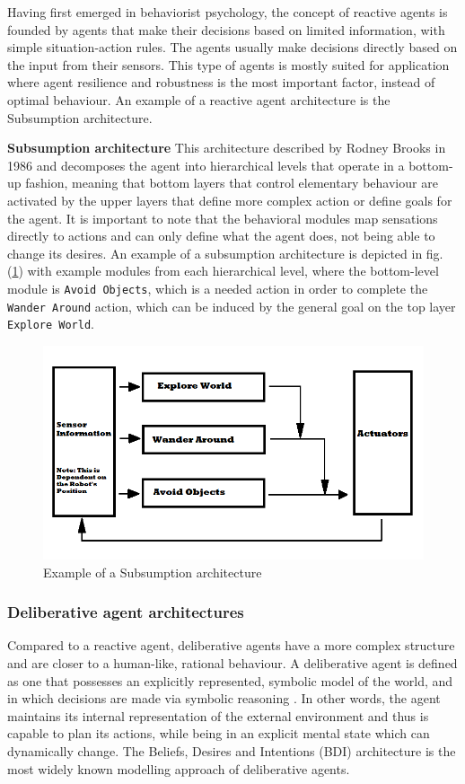 \documentclass[main.tex]{subfiles}
\begin{document}
Having first emerged in behaviorist psychology, the concept of reactive agents is founded by agents
that make their decisions based on limited information, with simple situation-action rules. The agents
usually make decisions directly based on the input from their sensors. This type of agents is mostly
suited for application where agent resilience and robustness is the most important factor, instead
of optimal behaviour. An example of a reactive agent architecture is the Subsumption architecture.

\textbf{Subsumption architecture}\newline
This architecture described by Rodney Brooks in 1986 \cite{1087032} and
decomposes the agent into hierarchical levels that operate in a bottom-up
fashion, meaning that bottom layers that control elementary behaviour are
activated by the upper layers that define more complex action or define goals for
the agent. It is important to note that the behavioral modules map sensations
directly to actions and can only define what the agent does, not being able to
change its desires. An example of a subsumption architecture is depicted in fig.
(\ref{Subsumption}) with example modules from each hierarchical level, where the
bottom-level module is \texttt{Avoid Objects}, which is a needed action in order
to complete the \texttt{Wander Around} action, which can be induced by the
general goal on the top layer \texttt{Explore World}.

\begin{figure}[htbp]
    \centering
    \includegraphics[width = .6\textwidth]{Subsumption_Architecture_Abstract_Diagram.png}
    \caption{Example of a Subsumption architecture \cite{Brooks1999}}
    \label{Subsumption}
\end{figure}

\subsubsection{Deliberative agent architectures}

Compared to a reactive agent, deliberative agents have a more complex structure and are closer to a
human-like, rational behaviour. A deliberative agent is defined as one that
possesses an explicitly represented, symbolic model of the world, and in which
decisions are made via symbolic reasoning \cite{Wooldridge1996}. In other words,
the agent maintains its internal representation of the external environment and
thus is capable to plan its actions, while being in an explicit mental state which
can dynamically change. The Beliefs, Desires and Intentions (BDI) architecture
is the most widely known modelling approach of deliberative agents.
\end{document}
